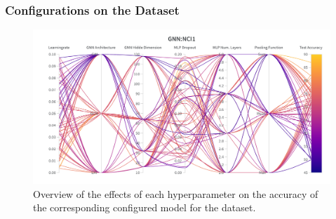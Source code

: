 \subsubsection{\gnn Configurations on the \reddit Dataset}
\begin{figure}[H]
    \centering
    \includegraphics[width=\textwidth, trim={0 75 0 150}, clip]{Figures/hyperparameter_gnn_reddit.png}
    \caption{Overview of the effects of each hyperparameter on the accuracy of the corresponding configured \gnn model for the \reddit dataset.}
    \label{fig:wandb_gnn_reddit}
\end{figure}
\clearpage

